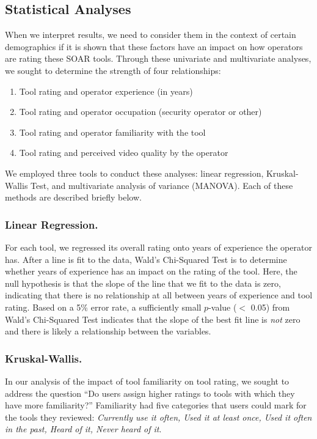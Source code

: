 \subsection{Statistical Analyses}
\vspace{-2mm}
When we interpret results, we need to consider them in the context of certain demographics if it is shown that these factors have an impact on how operators are rating these SOAR tools. Through these univariate and multivariate analyses, we sought to determine the strength of four relationships: 
\begin{enumerate}
\item Tool rating and operator experience (in years)
\item Tool rating and operator occupation (security operator or other)
\item Tool rating and operator familiarity with the tool
\item Tool rating and perceived video quality by the operator
\end{enumerate}
We employed three tools to conduct these analyses: linear regression, Kruskal-Wallis Test, and multivariate analysis of variance (MANOVA). Each of these methods are described briefly below.

\subsubsection{Linear Regression.}
For each tool, we regressed its overall rating onto years of experience the operator has. After a line is fit to the data, Wald's Chi-Squared Test is to determine whether years of experience has an impact on the rating of the tool. Here, the null hypothesis is that the slope of the line that we fit to the data is zero, indicating that there is no relationship at all between years of experience and tool rating. Based on a 5\% error rate, a sufficiently small $p$-value ($<$ 0.05) from Wald's Chi-Squared Test indicates that the slope of the best fit line is \textit{not} zero and there is likely a relationship between the variables. 
\subsubsection{Kruskal-Wallis.}
In our analysis of the impact of tool familiarity on tool rating, we sought to address the question ``Do users assign higher ratings to tools with which they have more familiarity?'' Familiarity had five categories that users could mark for the tools they reviewed: \textit{Currently use it often, Used it at least once, Used it often in the past, Heard of it, Never heard of it}. 


